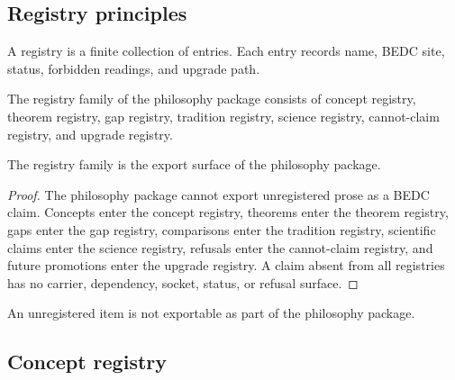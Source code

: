 \subsection{Registry principles}
\label{subsec:philosophy-registry-principles}

\begin{definition}[Registry]
\label{def:philosophy-registry}
A registry is a finite collection of entries. Each entry records name,
BEDC site, status, forbidden readings, and upgrade path.
\end{definition}

\begin{definition}
\label{def:philosophy-registry-family}
The registry family of the philosophy package consists of concept
registry, theorem registry, gap registry, tradition registry, science
registry, cannot-claim registry, and upgrade registry.
\end{definition}

\begin{theorem}
\label{thm:philosophy-registry-family-export-surface}
The registry family is the export surface of the philosophy package.
\end{theorem}
\begin{proof}
The philosophy package cannot export unregistered prose as a BEDC
claim. Concepts enter the concept registry, theorems enter the theorem
registry, gaps enter the gap registry, comparisons enter the tradition
registry, scientific claims enter the science registry, refusals enter
the cannot-claim registry, and future promotions enter the upgrade
registry. A claim absent from all registries has no carrier,
dependency, socket, status, or refusal surface.
\end{proof}

\begin{corollary}
\label{cor:philosophy-no-registry-no-export}
An unregistered item is not exportable as part of the philosophy
package.
\end{corollary}

\subsection{Concept registry}
\label{subsec:philosophy-concept-registry-table}

